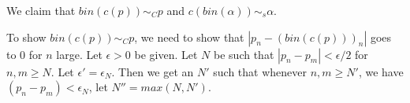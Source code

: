   We claim that $bin(c(p)) \sim_C p $ and $c(bin(\alpha)) \sim_s \alpha$. 




  To show $bin(c(p)) \sim_C p$, we need to show that $|p_n - (bin(c(p)))_n|$ goes to $0$ for $n$ large. 
  Let $\epsilon>0$ be given.
  Let $N$ be such that $|p_n - p_m|< \epsilon/2$ for $n,m\geq N$. 
  Let $\epsilon' = \epsilon_N$. 
  Then we get an $N'$ such that whenever $n,m\geq N'$, we have 
  $(p_n-p_m) < \epsilon_N$, 
  let $N'' = max (N,N')$. 
  

















%
%
%
%


